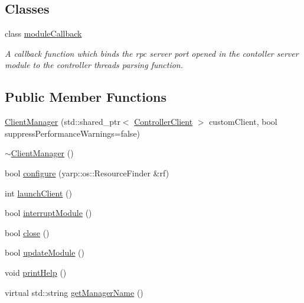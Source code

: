 \subsection*{Classes}
\begin{DoxyCompactItemize}
\item 
class \hyperlink{classocra__recipes_1_1ClientManager_1_1moduleCallback}{module\+Callback}
\begin{DoxyCompactList}\small\item\em A callback function which binds the rpc server port opened in the contoller server module to the controller thread\textquotesingle{}s parsing function. \end{DoxyCompactList}\end{DoxyCompactItemize}
\subsection*{Public Member Functions}
\begin{DoxyCompactItemize}
\item 
\hyperlink{classocra__recipes_1_1ClientManager_aadbaa17c291e9c88e8e12fb09b33ce84}{Client\+Manager} (std\+::shared\+\_\+ptr$<$ \hyperlink{classocra__recipes_1_1ControllerClient}{Controller\+Client} $>$ custom\+Client, bool suppress\+Performance\+Warnings=false)
\item 
\hyperlink{classocra__recipes_1_1ClientManager_af605d4fa9dab04b9874bf307277cd8a3}{$\sim$\+Client\+Manager} ()
\item 
bool \hyperlink{classocra__recipes_1_1ClientManager_a341d7c03d2c2b645f9b815f02baf323e}{configure} (yarp\+::os\+::\+Resource\+Finder \&rf)
\item 
int \hyperlink{classocra__recipes_1_1ClientManager_a443fb4edc4bac1c1e24e32f26a730519}{launch\+Client} ()
\item 
bool \hyperlink{classocra__recipes_1_1ClientManager_a3724b1ba55a2a0e81774aa674f567e34}{interrupt\+Module} ()
\item 
bool \hyperlink{classocra__recipes_1_1ClientManager_ace715a5dc663e956edc24d976cc7ad09}{close} ()
\item 
bool \hyperlink{classocra__recipes_1_1ClientManager_a2fb40c4d2440367c4f66ad5815e6b1f8}{update\+Module} ()
\item 
void \hyperlink{classocra__recipes_1_1ClientManager_aa935699ac8fe135a066ce69f7ebc6d0d}{print\+Help} ()
\item 
virtual std\+::string \hyperlink{classocra__recipes_1_1ClientManager_a3fd7aa39812c9ffdb32b732c4f854862}{get\+Manager\+Name} ()
\end{DoxyCompactItemize}
